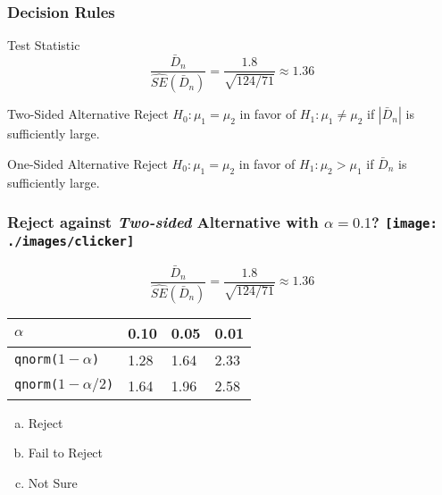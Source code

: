 \begin{frame}
\frametitle{Decision Rules}
\small
{}
\vspace{0.1em}


\begin{block}
	{Test Statistic}
$$\displaystyle \frac{\bar{D}_n}{\widehat{SE}(\bar{D}_n)}=\frac{1.8}{\sqrt{124/71}} \approx 1.36$$
\end{block}


\begin{block}{Two-Sided Alternative} 
Reject $H_0\colon \mu_1 = \mu_2$ in favor of $H_1\colon \mu_1 \neq \mu_2$ if $|\bar{D}_n|$ is sufficiently large.
\end{block}
\begin{block}{One-Sided Alternative}
Reject $H_0\colon \mu_1 = \mu_2$ in favor of $H_1\colon \mu_2 >\mu_1$ if $\bar{D}_n$ is sufficiently large.
\end{block}
\end{frame}

\begin{frame}
\frametitle{Reject against \emph{Two-sided} Alternative with $\alpha = 0.1$?  \texttt{[image: ./images/clicker]}}

	$$\boxed{\displaystyle \frac{\bar{D}_n}{\widehat{SE}(\bar{D}_n)}= \frac{1.8}{\sqrt{124/71}} \approx 1.36} $$

\begin{center}
\begin{tabular}{l|lll}
$\alpha$ &   0.10& 0.05 &0.01\\
\hline
\texttt{qnorm($1-\alpha$)} & 1.28 &1.64 &2.33\\
\texttt{qnorm($1-\alpha/2$)} &1.64 &1.96& 2.58
\end{tabular}
\end{center}

\begin{enumerate}[(a)]
\item Reject
\item Fail to Reject
\item Not Sure
\end{enumerate}

\end{frame}

